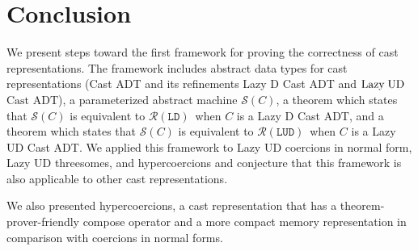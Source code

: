 \documentclass[runningheads]{llncs}
\newcommand{\LUD}{\ensuremath{\text{Lazy\;UD}}}
\newcommand{\CastADT}{\ensuremath{\text{Cast ADT}}}
\newcommand{\RMachine}[1]{\ensuremath{\mathcal{R}(#1)}}
\newcommand{\LDMachine}{\RMachine{\BLD}}
\newcommand{\LUDMachine}{\RMachine{\BLUD}}
\newcommand{\SMachine}[1]{\ensuremath{\mathcal{S}(#1)}}
\newcommand{\BLD}[0]{\ensuremath{\mathtt{LD}}}
\newcommand{\BLUD}[0]{\ensuremath{\mathtt{LUD}}}
\begin{document}
\section{Conclusion} \label{sec:conclusion}

We present steps toward the first framework for proving the
correctness of cast representations.
%
The framework includes abstract data types for cast representations
(Cast ADT and its refinements Lazy D Cast ADT and \LUD\ \CastADT), 
a parameterized abstract machine \SMachine{C}, 
a theorem which states that \SMachine{C} is equivalent
to \LDMachine\ when $C$ is a Lazy D Cast ADT, and
a theorem which states that \SMachine{C} is equivalent
to \LUDMachine\ when $C$ is a Lazy UD Cast ADT.
%
%
We applied this framework to Lazy UD coercions in normal form,
Lazy UD threesomes, and hypercoercions and conjecture that
this framework is also applicable to other cast representations.

We also presented hypercoercions, a cast representation that has a 
theorem-prover-friendly compose operator and a more compact memory
representation in comparison with coercions in normal forms.

%
%
%
% 
% 
%
%

{}
\end{document}
